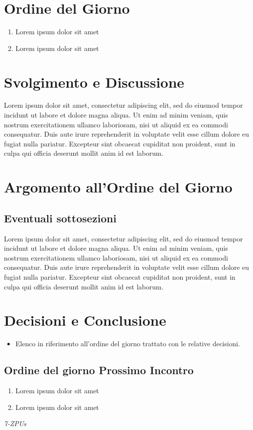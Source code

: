 \documentclass[a4paper,12pt]{article}
\begin{document}
\section{Ordine del Giorno}
\begin{enumerate}
    \item Lorem ipsum dolor sit amet
    \item Lorem ipsum dolor sit amet
\end{enumerate}
\vspace{0.5cm}
\section{Svolgimento e Discussione}
Lorem ipsum dolor sit amet, consectetur adipiscing elit, sed do eiusmod tempor incidunt ut labore et dolore magna aliqua. Ut enim ad minim veniam, quis nostrum exercitationem ullamco laboriosam, nisi ut aliquid ex ea commodi consequatur. Duis aute irure reprehenderit in voluptate velit esse cillum dolore eu fugiat nulla pariatur. Excepteur sint obcaecat cupiditat non proident, sunt in culpa qui officia deserunt mollit anim id est laborum.

\vspace{0.5cm}
\section{Argomento all'Ordine del Giorno}

\subsection{Eventuali sottosezioni}
Lorem ipsum dolor sit amet, consectetur adipiscing elit, sed do eiusmod tempor incidunt ut labore et dolore magna aliqua. Ut enim ad minim veniam, quis nostrum exercitationem ullamco laboriosam, nisi ut aliquid ex ea commodi consequatur. Duis aute irure reprehenderit in voluptate velit esse cillum dolore eu fugiat nulla pariatur. Excepteur sint obcaecat cupiditat non proident, sunt in culpa qui officia deserunt mollit anim id est laborum.

\vspace{0.5cm}
\section{Decisioni e Conclusione}
\begin{itemize}
    \item Elenco in riferimento all'ordine del giorno trattato con le relative decisioni.
\end{itemize}

\subsection{Ordine del giorno Prossimo Incontro}
\begin{enumerate}
    \item Lorem ipsum dolor sit amet
    \item Lorem ipsum dolor sit amet
\end{enumerate}

\vfill
\begin{flushright}
    \textit{7-ZPUs}
\end{flushright}
\end{document}
